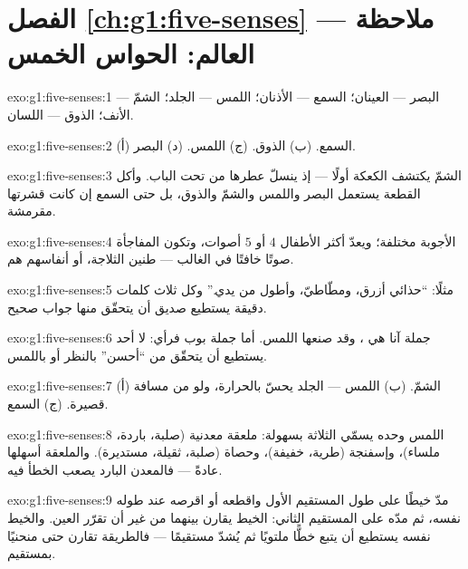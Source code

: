 \section*{الفصل \ref{ch:g1:five-senses} --- ملاحظة العالم: الحواس الخمس}

\begin{solution}{exo:g1:five-senses:1}
البصر --- العينان؛ السمع --- الأذنان؛ اللمس --- الجلد؛ الشمّ
--- الأنف؛ الذوق --- اللسان.
\end{solution}

\begin{solution}{exo:g1:five-senses:2}
(أ) السمع. (ب) الذوق. (ج) اللمس. (د) البصر.
\end{solution}

\begin{solution}{exo:g1:five-senses:3}
الشمّ يكتشف الكعكة أولًا --- إذ ينسلّ عطرها من تحت الباب.
وأكل القطعة يستعمل البصر واللمس والشمّ والذوق، بل حتى السمع
إن كانت قشرتها مقرمشة.
\end{solution}

\begin{solution}{exo:g1:five-senses:4}
الأجوبة مختلفة؛ ويعدّ أكثر الأطفال $4$ أو $5$ أصوات، وتكون
المفاجأة صوتًا خافتًا في الغالب --- طنين الثلاجة، أو أنفاسهم
هم.
\end{solution}

\begin{solution}{exo:g1:five-senses:5}
مثلًا: ``حذائي أزرق، ومطّاطيّ، وأطول من يدي.'' وكل ثلاث كلمات
دقيقة يستطيع صديق أن يتحقّق منها جواب صحيح.
\end{solution}

\begin{solution}{exo:g1:five-senses:6}
جملة آنا هي ، وقد صنعها اللمس. أما جملة بوب فرأي:
لا أحد يستطيع أن يتحقّق من ``أحسن'' بالنظر أو باللمس.
\end{solution}

\begin{solution}{exo:g1:five-senses:7}
(أ) الشمّ. (ب) اللمس --- الجلد يحسّ بالحرارة، ولو من مسافة
قصيرة. (ج) السمع.
\end{solution}

\begin{solution}{exo:g1:five-senses:8}
اللمس وحده يسمّي الثلاثة بسهولة: ملعقة معدنية (صلبة، باردة،
ملساء)، وإسفنجة (طرية، خفيفة)، وحصاة (صلبة، ثقيلة، مستديرة).
والملعقة أسهلها عادةً --- فالمعدن البارد يصعب الخطأ فيه.
\end{solution}

\begin{solution}{exo:g1:five-senses:9}
مدّ خيطًا على طول المستقيم الأول واقطعه أو اقرصه عند طوله نفسه،
ثم مدّه على المستقيم الثاني: الخيط يقارن بينهما من غير أن تقرّر
العين. والخيط نفسه يستطيع أن يتبع خطًّا ملتويًا ثم يُشدّ مستقيمًا
--- فالطريقة تقارن حتى منحنيًا بمستقيم.
\end{solution}
